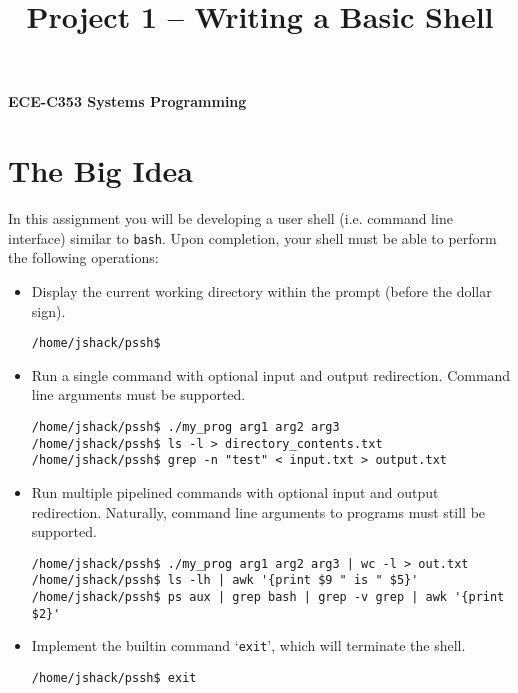 \documentclass[10pt]{article}
\title{Project 1 -- Writing a Basic Shell}
\makeatletter
\def\maketitle{\begin{center}{\bfseries \Large ECE-C353 Systems Programming \\ \@title} \end{center}\vspace{10pt}}
\makeatother
\begin{document}
\maketitle

\section{The Big Idea}

In this assignment you will be developing a user shell (i.e. command
line interface) similar to \texttt{bash}.  Upon completion, your shell
must be able to perform the following operations:

\begin{itemize}
    \item Display the current working directory within the prompt
        (before the dollar sign).

\begin{verbatim}
/home/jshack/pssh$
\end{verbatim}

    \item Run a single command with optional input and output
        redirection.  Command line arguments must be supported.

\begin{verbatim}
/home/jshack/pssh$ ./my_prog arg1 arg2 arg3
/home/jshack/pssh$ ls -l > directory_contents.txt
/home/jshack/pssh$ grep -n "test" < input.txt > output.txt
\end{verbatim}

    \item Run multiple pipelined commands with optional input and output
        redirection. Naturally, command line arguments to programs must
        still be supported.

\begin{verbatim}
/home/jshack/pssh$ ./my_prog arg1 arg2 arg3 | wc -l > out.txt
/home/jshack/pssh$ ls -lh | awk '{print $9 " is " $5}'
/home/jshack/pssh$ ps aux | grep bash | grep -v grep | awk '{print $2}'
\end{verbatim}

    \item Implement the builtin command `\texttt{exit}', which will
        terminate the shell.

\begin{verbatim}
/home/jshack/pssh$ exit
\end{verbatim}


\end{itemize}
\end{document}
